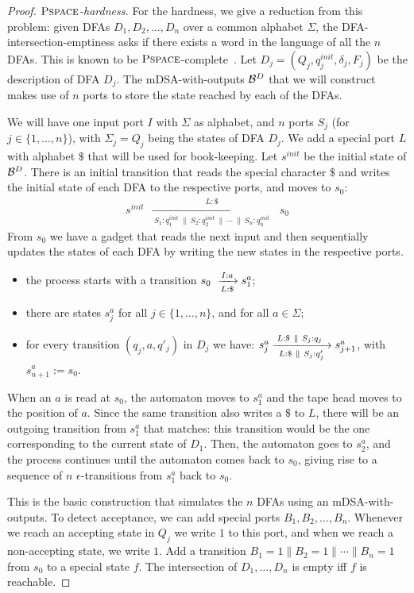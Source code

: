 \begin{proof}
    \emph{$\operatorname{\textsc{Pspace}}$-hardness.} For the hardness, we give a reduction from this problem: given DFAs $D_1, D_2, \dots, D_n$ over a common alphabet $\Sigma$, the DFA-intersection-emptiness asks if there exists a word in the language of all the $n$ DFAs. This is known to be $\operatorname{\textsc{Pspace}}$-complete~\cite{10.1109/SFCS.1977.16}. Let $D_j = (Q_j, q^{init}_j, \delta_j, F_j)$ be the description of DFA $D_j$. The mDSA-with-outputs $\mathcal{B}^D$ that we will construct makes use of $n$ ports to store the state reached by each of the DFAs.

    We will have one input port $I$ with $\Sigma$ as alphabet, and $n$ ports $S_j$ (for $j \in \{1, \dots, n\}$), with $\Sigma_j = Q_j$ being the states of DFA $D_j$. We add a special port $L$ with alphabet $\$$ that will be used for book-keeping. Let $s^{init}$ be the initial state of $\mathcal{B}^D$. There is an initial transition that reads the special character $\$$ and writes the initial state of each DFA to the respective ports, and moves to $s_0$:
    \begin{align*}
    s^{init}~~ \xrightarrow[~S_1: q^{init}_1 ~\parallel~ S_2: q^{init}_2 ~\parallel~ \cdots ~\parallel~ S_n: q^{init}_n~]{L: \$} ~~s_0
    \end{align*}
    From $s_0$ we have a gadget that reads the next input and then sequentially updates the states of each DFA by writing the new states in the respective ports. 
    \begin{itemize}
        \item the process starts with a transition $s_0~\xrightarrow[L:\$]{I:a} s^a_1$; 
        \item there are states $s^a_{j}$ for all $j \in \{1, \dots, n\}$, and for all $a \in \Sigma$;
        \item for every transition $(q_j, a, q'_j)$ in $D_j$ we have: $s^a_j \xrightarrow[~L:\$~\parallel~S_j: q'_j~]{L:\$ ~\parallel~ S_j: q_j~} s^a_{j+1}$, with $s^a_{n+1} := s_0$.
    \end{itemize}
    When an $a$ is read at $s_0$, the automaton moves to $s^a_1$ and the tape head moves to the position of $a$. Since the same transition also writes a $\$$ to $L$, there will be an outgoing transition from $s^a_1$ that matches: this transition would be the one corresponding to the current state of $D_1$. Then, the automaton goes to $s^a_2$, and the process continues until the automaton comes back to $s_0$, giving rise to a sequence of $n$ $\epsilon$-transitions from $s^a_1$ back to $s_0$. 

    This is the basic construction that simulates the $n$ DFAs using an mDSA-with-outputs. To detect acceptance, we can add special ports $B_1, B_2, \dots, B_n$. Whenever we reach an accepting state in $Q_j$ we write $1$ to this port, and when we reach a non-accepting state, we write $1$. Add a transition $B_1 = 1 \parallel B_2 = 1 \parallel \cdots \parallel B_n = 1$ from $s_0$ to a special state $f$. The intersection of $D_1, \dots, D_n$ is empty iff $f$ is reachable.


\end{proof}
